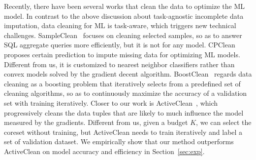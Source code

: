 Recently, there have  been several works that clean the data to optimize the ML model. 
In contrast to the above discussion about task-agnostic incomplete data imputation, data cleaning for ML is task-aware, which triggers new technical challenges.
SampleClean~\cite{DBLP:journals/debu/KrishnanWFGKM015} focuses on cleaning selected samples, so as to answer  SQL aggregate  queries  more efficiently, but it is not for any model.
%
 CPClean~\cite{DBLP:journals/pvldb/KarlasLWGC0020} proposes certain prediction to impute missing data for optimizing ML models. Different from us, it is customized to nearest neighbor classifiers rather than convex models solved by the gradient decent algorithm. 
  BoostClean~\cite{DBLP:journals/corr/abs-1711-01299} regards data cleaning as a boosting problem that iteratively
 selects from a predefined set of cleaning algorithms, so as to continuously maximize the accuracy of  a validation set with training iteratively. 
Closer to our work is ActiveClean~\cite{DBLP:journals/pvldb/KrishnanWWFG16}, which progressively cleans the data tuples that are likely to much influence the model   measured by the gradients. 
Different from us,  given a budget $K$, we can select the coreset without training, but ActiveClean needs to train iteratively  and label a set of   validation  dataset.  We empirically show that our method outperforms ActiveClean on model accuracy and efficiency in Section~\ref{sec:exp}.



